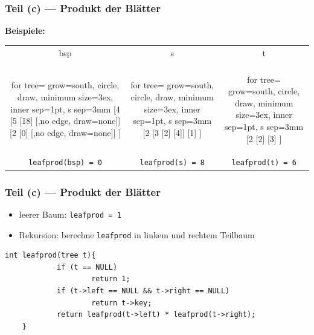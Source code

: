 \documentclass{beamer}
\begin{document}
\begin{frame}[fragile] \frametitle{Teil (c) --- Produkt der Blätter}
	\textbf{Beispiele:}
	
	\begin{center}
		\begin{tabular}{ccc}
			bsp & s & t \\ \\
			\begin{forest}
				for tree={ grow=south, circle, draw, minimum size=3ex, inner sep=1pt, s sep=3mm }
				[4 	[5 [18] [,no edge, draw=none]] [2 [0] [,no edge, draw=none]] ]
			\end{forest}
			&
			\begin{forest}
				for tree={ grow=south, circle, draw, minimum size=3ex, inner sep=1pt, s sep=3mm }
				[2 	[3 [2] [4]] [1] ]
			\end{forest}
			&
			\begin{forest}
				for tree={ grow=south, circle, draw, minimum size=3ex, inner sep=1pt, s sep=3mm }
				[2 	[2] [3] ]
			\end{forest} \\ \pause
			\footnotesize \texttt{leafprod(bsp) = 0} &
			\footnotesize \texttt{leafprod(s) = 8} &
			\footnotesize \texttt{leafprod(t) = 6}
		\end{tabular}
	\end{center}
\end{frame}
\begin{frame}[fragile] \frametitle{Teil (c) --- Produkt der Blätter}
	\begin{itemize}
		\item leerer Baum: \texttt{leafprod = 1}
		\item Rekursion: berechne \texttt{leafprod} in linkem und rechtem Teilbaum
	\end{itemize}
	\pause
	\begin{lstlisting}[style=notebook]
	int leafprod(tree t){
			if (t == NULL)
					return 1;
			if (t->left == NULL && t->right == NULL)
					return t->key;
			return leafprod(t->left) * leafprod(t->right);
	}
	\end{lstlisting}
\end{frame}
\end{document}
